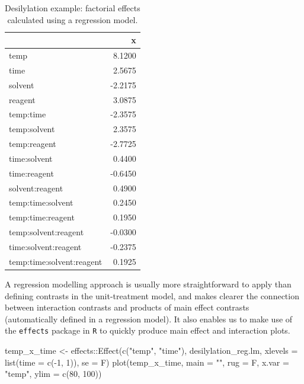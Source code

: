 \documentclass[
]{book}
\newenvironment{Shaded}{\begin{snugshade}}{\end{snugshade}}
\newcommand{\AttributeTok}[1]{\textcolor[rgb]{0.77,0.63,0.00}{#1}}
\newcommand{\DecValTok}[1]{\textcolor[rgb]{0.00,0.00,0.81}{#1}}
\newcommand{\FunctionTok}[1]{\textcolor[rgb]{0.00,0.00,0.00}{#1}}
\newcommand{\NormalTok}[1]{#1}
\newcommand{\OtherTok}[1]{\textcolor[rgb]{0.56,0.35,0.01}{#1}}
\newcommand{\SpecialCharTok}[1]{\textcolor[rgb]{0.00,0.00,0.00}{#1}}
\newcommand{\StringTok}[1]{\textcolor[rgb]{0.31,0.60,0.02}{#1}}
\theoremstyle{definition}
\theoremstyle{definition}
\theoremstyle{definition}
\theoremstyle{definition}
\theoremstyle{remark}
\begin{document}
\begin{table}

\caption{\label{tab:desilylation-reg}Desilylation example: factorial effects calculated using a regression model.}
\centering
\begin{tabular}[t]{l|r}
\hline
  & x\\
\hline
temp & 8.1200\\
\hline
time & 2.5675\\
\hline
solvent & -2.2175\\
\hline
reagent & 3.0875\\
\hline
temp:time & -2.3575\\
\hline
temp:solvent & 2.3575\\
\hline
temp:reagent & -2.7725\\
\hline
time:solvent & 0.4400\\
\hline
time:reagent & -0.6450\\
\hline
solvent:reagent & 0.4900\\
\hline
temp:time:solvent & 0.2450\\
\hline
temp:time:reagent & 0.1950\\
\hline
temp:solvent:reagent & -0.0300\\
\hline
time:solvent:reagent & -0.2375\\
\hline
temp:time:solvent:reagent & 0.1925\\
\hline
\end{tabular}
\end{table}

A regression modelling approach is usually more straightforward to apply than defining contrasts in the unit-treatment model, and makes clearer the connection between interaction contrasts and products of main effect contrasts (automatically defined in a regression model). It also enables us to make use of the \texttt{effects} package in \texttt{R} to quickly produce main effect and interaction plots.

\begin{Shaded}
\begin{Highlighting}[]
\NormalTok{temp\_x\_time }\OtherTok{\textless{}{-}}\NormalTok{ effects}\SpecialCharTok{::}\FunctionTok{Effect}\NormalTok{(}\FunctionTok{c}\NormalTok{(}\StringTok{"temp"}\NormalTok{, }\StringTok{"time"}\NormalTok{), desilylation\_reg.lm, }\AttributeTok{xlevels =} \FunctionTok{list}\NormalTok{(}\AttributeTok{time =} \FunctionTok{c}\NormalTok{(}\SpecialCharTok{{-}}\DecValTok{1}\NormalTok{, }\DecValTok{1}\NormalTok{)), }\AttributeTok{se =}\NormalTok{ F)}
\FunctionTok{plot}\NormalTok{(temp\_x\_time, }\AttributeTok{main =} \StringTok{""}\NormalTok{, }\AttributeTok{rug =}\NormalTok{ F, }\AttributeTok{x.var =} \StringTok{"temp"}\NormalTok{, }\AttributeTok{ylim =} \FunctionTok{c}\NormalTok{(}\DecValTok{80}\NormalTok{, }\DecValTok{100}\NormalTok{))}
\end{Highlighting}
\end{Shaded}
\end{document}
